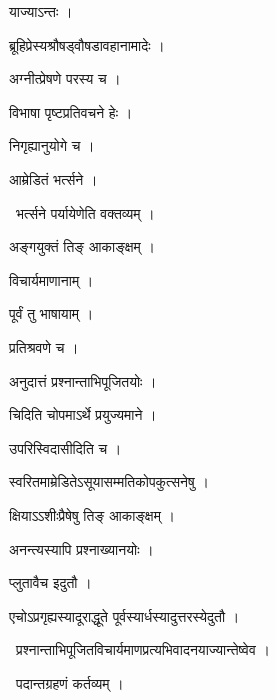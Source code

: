 \documentclass[10pt, openany, oneside]{book}
\begin{document}
\noindent याज्याऽन्तः ।

\noindent ब्रूहिप्रेस्यश्रौषड्वौषडावहानामादेः ।

\noindent अग्नीत्प्रेषणे परस्य च ।

\noindent विभाषा पृष्टप्रतिवचने हेः ।

\noindent निगृह्यानुयोगे च ।

\noindent आम्रेडितं भर्त्सने ।

\par\noindent\hspace{1.5em}{\vps वा॰}~{\qt भर्त्सने पर्यायेणेति वक्तव्यम् ।}

\noindent अङ्गयुक्तं तिङ् आकाङ्क्षम् ।

\noindent विचार्यमाणानाम् ।

\noindent पूर्वं तु भाषायाम् ।

\noindent प्रतिश्रवणे च ।

\noindent अनुदात्तं प्रश्नान्ताभिपूजितयोः ।

\noindent चिदिति चोपमाऽर्थे प्रयुज्यमाने ।

\noindent उपरिस्विदासीदिति च ।

\noindent स्वरितमाम्रेडितेऽसूयासम्मतिकोपकुत्सनेषु ।

\noindent क्षियाऽऽशीःप्रैषेषु तिङ् आकाङ्क्षम् ।

\noindent अनन्त्यस्यापि प्रश्नाख्यानयोः ।

\noindent प्लुतावैच इदुतौ ।

\noindent एचोऽप्रगृह्यस्यादूराद्धूते पूर्वस्यार्धस्यादुत्तरस्येदुतौ ।

\par\noindent\hspace{1.5em}{\vps वा॰}~{\qt प्रश्नान्ताभिपूजितविचार्यमाणप्रत्यभिवादनयाज्यान्तेष्वेव ।}

\par\noindent\hspace{1.5em}{\vps वा॰}~{\qt पदान्तग्रहणं कर्तव्यम् ।}
\end{document}
